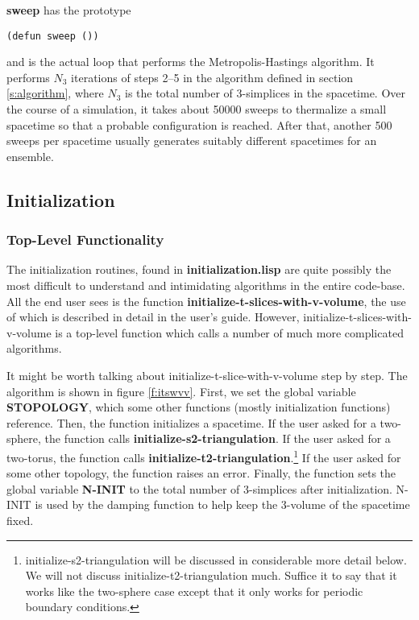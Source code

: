 \documentclass[12pt]{article}
\begin{document}
\textbf{sweep} has the prototype 
\begin{lstlisting}
(defun sweep ())
\end{lstlisting}
and is the actual loop that performs the Metropolis-Hastings
algorithm. It performs $N_3$ iterations of steps 2--5 in the algorithm
defined in section \ref{s:algorithm}, where $N_3$ is the total number
of 3-simplices in the spacetime. Over the course of a simulation, it
takes about 50000 sweeps to thermalize a small spacetime so that a
probable configuration is reached. After that, another 500 sweeps per
spacetime usually generates suitably different spacetimes for an
ensemble.

\subsection{Initialization}
\label{s:initialization}
\subsubsection{Top-Level Functionality}
\label{s:initialization:top-level}
The initialization routines, found in \textbf{initialization.lisp} are
quite possibly the most difficult to understand and intimidating
algorithms in the entire code-base. All the end user sees is the
function \textbf{initialize-t-slices-with-v-volume}, the use of which
is described in detail in the user's guide. However,
initialize-t-slices-with-v-volume is a top-level function which calls
a number of much more complicated algorithms.

It might be worth talking about initialize-t-slice-with-v-volume step
by step. The algorithm is shown in figure \ref{f:itswvv}. First, we
set the global variable \textbf{STOPOLOGY}, which some other functions
(mostly initialization functions) reference. Then, the function
initializes a spacetime. If the user asked for a two-sphere, the
function calls \textbf{initialize-s2-triangulation}. If the user asked
for a two-torus, the function calls
\textbf{initialize-t2-triangulation}.\footnote{initialize-s2-triangulation
  will be discussed in considerable more detail below. We will not
  discuss initialize-t2-triangulation much. Suffice it to say that it
  works like the two-sphere case except that it only works for
  periodic boundary conditions.} If the user asked for some other
topology, the function raises an error. Finally, the function sets the
global variable \textbf{N-INIT} to the total number of 3-simplices
after initialization. N-INIT is used by the damping function to help
keep the 3-volume of the spacetime fixed.
\end{document}
